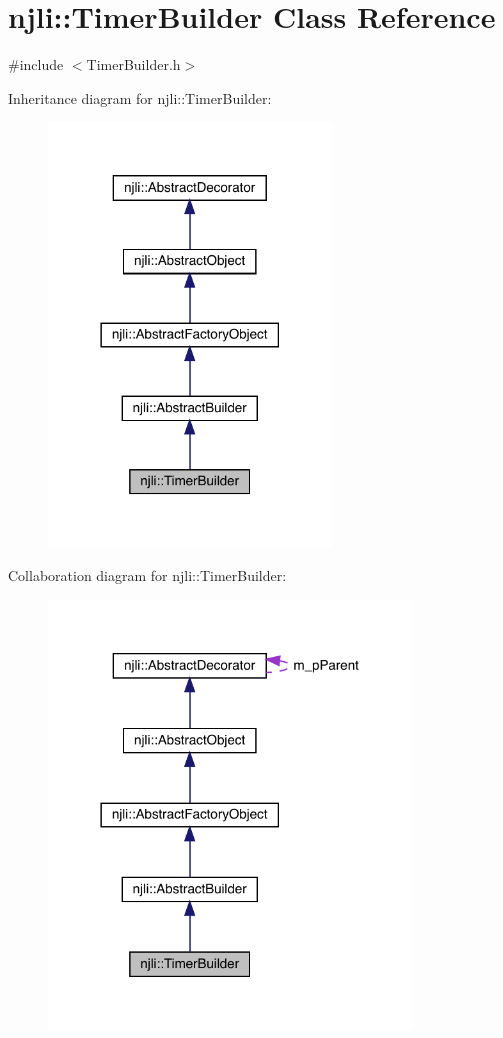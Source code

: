 \hypertarget{classnjli_1_1_timer_builder}{}\section{njli\+:\+:Timer\+Builder Class Reference}
\label{classnjli_1_1_timer_builder}


{\ttfamily \#include $<$Timer\+Builder.\+h$>$}



Inheritance diagram for njli\+:\+:Timer\+Builder\+:\nopagebreak
\begin{figure}[H]
\begin{center}
\leavevmode
\includegraphics[width=213pt]{classnjli_1_1_timer_builder__inherit__graph}
\end{center}
\end{figure}


Collaboration diagram for njli\+:\+:Timer\+Builder\+:\nopagebreak
\begin{figure}[H]
\begin{center}
\leavevmode
\includegraphics[width=273pt]{classnjli_1_1_timer_builder__coll__graph}
\end{center}
\end{figure}
